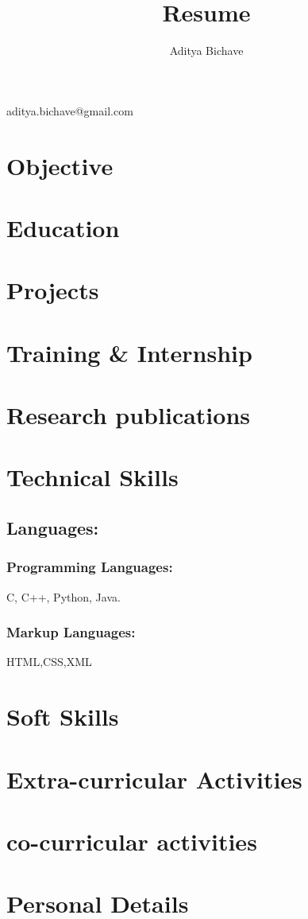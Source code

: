 \documentclass[10pt]{article}
\makeatletter
\renewcommand{\maketitle}{
\begin{center}
{\Large\bfseries
\theauthor}

\vspace{.25em}

aditya.bichave@gmail.com   
\end{center}
}
\makeatother
\begin{document}
\title{Resume}
\author{Aditya Bichave}
\maketitle

\section{Objective}

\section{Education}

\section{Projects}

\section{Training \& Internship}

\section{Research publications}

\section{Technical Skills}
	\subsection{Languages:}
		\subsubsection{Programming Languages: }
			C, C++, Python, Java.
		\subsubsection{Markup Languages:}
			HTML,CSS,XML

\section{Soft Skills}

\section{Extra-curricular Activities}

\section{co-curricular activities}

\section{Personal Details}
\end{document}
